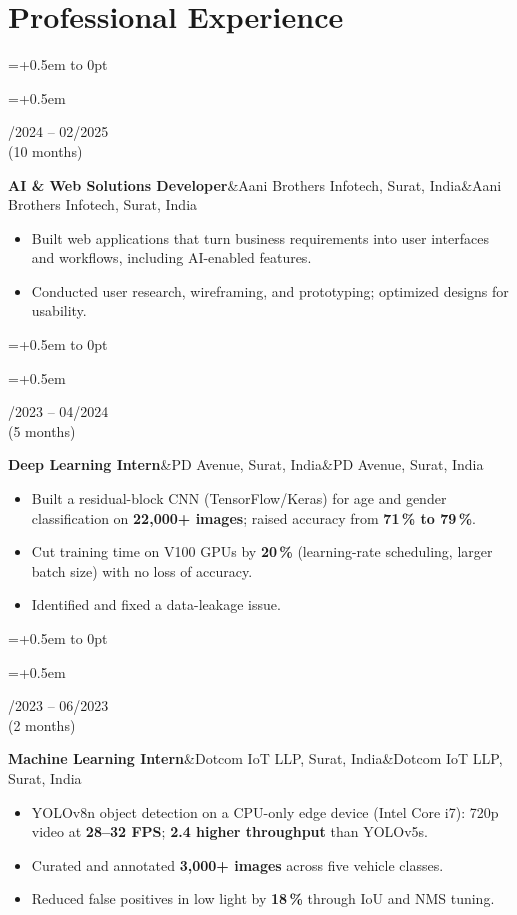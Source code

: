 \documentclass[10pt,a4paper]{article}
\newlength{\leftcol}\setlength{\leftcol}{2.45cm}
\newcommand{\gap}{0.5em}
\newcommand{\sep}{\hspace{0.45em}\textbar\hspace{0.45em}}
\newcommand{\entry}[3]{%
  \begingroup\raggedright\leftskip=\dimexpr\leftcol+\gap\relax\noindent
  \hspace*{-\dimexpr\leftcol+\gap\relax}%
  \vtop to 0pt{\hsize=\dimexpr\leftcol+\gap\relax\raggedright\small\color{mid}\noindent #1\par\vss}%
  #2\par #3\par\endgroup\vspace{5pt}}
\newcommand{\etitle}[2]{\textbf{#1}\ifx&#2&\else\textcolor{mid}{\sep}#2\fi}
\begin{document}
\section*{Professional Experience}
\entry{05/2024 -- 02/2025\\(10 months)}
  {\etitle{AI \& Web Solutions Developer}{Aani Brothers Infotech, Surat, India}}
  {\begin{itemize}
    \item Built web applications that turn business requirements into user interfaces and workflows, including AI-enabled features.
    \item Conducted user research, wireframing, and prototyping; optimized designs for usability.
  \end{itemize}}
\entry{12/2023 -- 04/2024\\(5 months)}
  {\etitle{Deep Learning Intern}{PD Avenue, Surat, India}}
  {\begin{itemize}
    \item Built a residual-block CNN (TensorFlow/Keras) for age and gender classification on \textbf{22,000+ images}; raised accuracy from \textbf{71\,\% to 79\,\%}.
    \item Cut training time on V100 GPUs by \textbf{20\,\%} (learning-rate scheduling, larger batch size) with no loss of accuracy.
    \item Identified and fixed a data-leakage issue.
  \end{itemize}}
\entry{05/2023 -- 06/2023\\(2 months)}
  {\etitle{Machine Learning Intern}{Dotcom IoT LLP, Surat, India}}
  {\begin{itemize}
    \item YOLOv8n object detection on a CPU-only edge device (Intel Core i7): 720p video at \textbf{28--32 FPS}; \textbf{2.4\texttimes{} higher throughput} than YOLOv5s.
    \item Curated and annotated \textbf{3,000+ images} across five vehicle classes.
    \item Reduced false positives in low light by \textbf{18\,\%} through IoU and NMS tuning.
  \end{itemize}}
\end{document}
